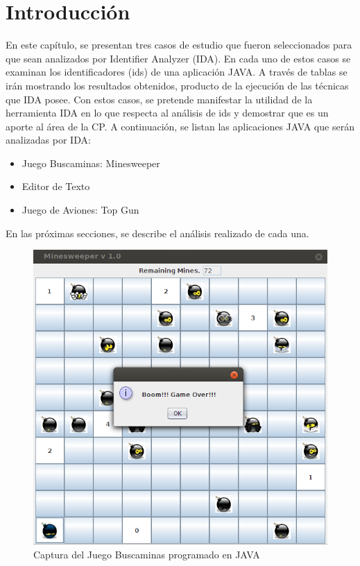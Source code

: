 \fancyhf{}
\pagestyle{fancy}
\lhead[]{\leftmark}
\chead[]{}
\rhead[]{\thepage}
\renewcommand{\headrulewidth}{1pt}

\section{Introducción}

En este capítulo, se presentan tres casos de estudio que fueron seleccionados para que sean analizados por Identifier Analyzer (IDA). En cada uno de estos casos se examinan los identificadores (ids) de una aplicación JAVA. A través de tablas se irán mostrando los resultados obtenidos, producto de la ejecución de las técnicas que IDA posee.
Con estos casos, se pretende manifestar la utilidad de la herramienta IDA en lo que respecta al análisis de ids y demostrar que es un aporte al área de la CP. A continuación, se listan las aplicaciones JAVA que serán analizadas por IDA:

\begin{itemize}
\itemsep0em%
\item Juego Buscaminas: Minesweeper
\item Editor de Texto
\item Juego de Aviones: Top Gun
\end{itemize}

En las próximas secciones, se describe el análisis realizado de cada una.

\begin{figure}[h!] %
\centerline{%
\includegraphics[scale= 0.6]{./cap5/caso_01.png}
}
\caption{Captura del Juego Buscaminas programado en JAVA}
\label{caso1}
\end{figure}

